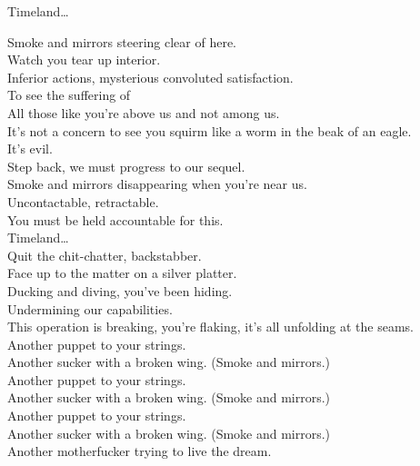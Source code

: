 
\label{album:made-in-timeland}




Timeland… \\




Smoke and mirrors steering clear of here. \\
Watch you tear up interior. \\
Inferior actions, mysterious convoluted satisfaction. \\
To see the suffering of \\
All those like you're above us and not among us. \\
It's not a concern to see you squirm like a worm in the beak of an eagle. \\
It's evil. \\
Step back, we must progress to our sequel. \\

Smoke and mirrors disappearing when you're near us. \\
Uncontactable, retractable. \\
You must be held accountable for this. \\

Timeland… \\

Quit the chit-chatter, backstabber. \\
Face up to the matter on a silver platter. \\
Ducking and diving, you've been hiding. \\
Undermining our capabilities. \\
This operation is breaking, you're flaking, it's all unfolding at the seams. \\

Another puppet to your strings. \\
Another sucker with a broken wing. (Smoke and mirrors.) \\
Another puppet to your strings. \\
Another sucker with a broken wing. (Smoke and mirrors.) \\
Another puppet to your strings. \\
Another sucker with a broken wing. (Smoke and mirrors.) \\
Another motherfucker trying to live the dream. \\
